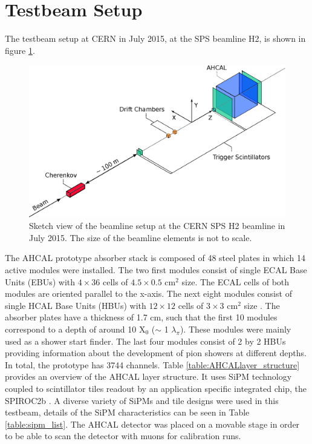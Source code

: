 \documentclass{JINST}
\begin{document}
\section{Testbeam Setup}

The testbeam setup at CERN in July 2015, at the SPS beamline H2, is shown in figure \ref{fig:TestbeamScketch}.

\begin{figure}[htbp!]
  \centering
  \includegraphics[width=0.7\linewidth]{fig/TestbeamSetup.eps}
  \caption{Sketch view of the beamline setup at the CERN SPS H2 beamline in July 2015. The size of the beamline elements is not to scale.} \label{fig:TestbeamScketch}
\end{figure}

The AHCAL prototype absorber stack is composed of 48 steel plates in which 14 active modules were installed. The two first modules consist of single ECAL Base Units (EBUs) with $4 \times 36$ cells of $4.5 \times 0.5$ cm$^2$ size. The ECAL cells of both modules are oriented parallel to the x-axis. The next eight modules consist of single HCAL Base Units (HBUs) with $12 \times 12$ cells of $3 \times 3$ cm$^2$ size . The absorber plates have a thickness of 1.7 cm, such that the first 10 modules correspond to a depth of around 10 X$_0$ ($\sim$ 1 $\lambda_{\pi}$). These modules were mainly used as a shower start finder. The last four modules consist of 2 by 2 HBUs providing information about the development of pion showers at different depths. In total, the prototype has 3744 channels. Table \ref{table:AHCALlayer_structure} provides an overview of the AHCAL layer structure. It uses SiPM technology coupled to scintillator tiles readout by an application specific integrated chip, the SPIROC2b \cite{5401891}. A diverse variety of SiPMs and tile designs were used in this testbeam, details of the SiPM characteristics can be seen in Table \ref{table:sipm_list}. The AHCAL detector was placed on a movable stage in order to be able to scan the detector with muons for calibration runs.
\end{document}
